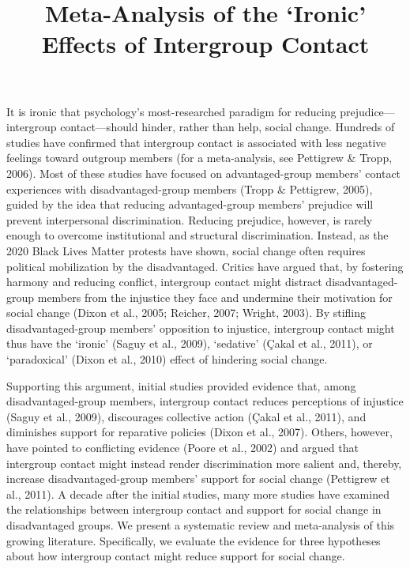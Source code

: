 \documentclass[twocolumn, 11pt, letterpaper]{article}
\title{ Meta-Analysis of the `Ironic' Effects of Intergroup Contact }
\author{  }
\begin{document}
\maketitle

\noindent It is ironic that psychology's most-researched paradigm for reducing
prejudice---intergroup contact---should hinder, rather than help, social
change. Hundreds of studies have confirmed that intergroup contact is
associated with less negative feelings toward outgroup members (for a
meta-analysis, see Pettigrew \& Tropp, 2006). Most of these studies have
focused on advantaged-group members' contact experiences with
disadvantaged-group members (Tropp \& Pettigrew, 2005), guided by the
idea that reducing advantaged-group members' prejudice will prevent
interpersonal discrimination. Reducing prejudice, however, is rarely
enough to overcome institutional and structural discrimination. Instead,
as the 2020 Black Lives Matter protests have shown, social change often
requires political mobilization by the disadvantaged. Critics have
argued that, by fostering harmony and reducing conflict, intergroup
contact might distract disadvantaged-group members from the injustice
they face and undermine their motivation for social change (Dixon et
al., 2005; Reicher, 2007; Wright, 2003). By stifling disadvantaged-group
members' opposition to injustice, intergroup contact might thus have the
`ironic' (Saguy et al., 2009), `sedative' (Çakal et al., 2011), or
`paradoxical' (Dixon et al., 2010) effect of hindering social change.

Supporting this argument, initial studies provided evidence that, among
disadvantaged-group members, intergroup contact reduces perceptions of
injustice (Saguy et al., 2009), discourages collective action (Çakal et
al., 2011), and diminishes support for reparative policies (Dixon et
al., 2007). Others, however, have pointed to conflicting evidence (Poore
et al., 2002) and argued that intergroup contact might instead render
discrimination more salient and, thereby, increase disadvantaged-group
members' support for social change (Pettigrew et al., 2011). A decade
after the initial studies, many more studies have examined the
relationships between intergroup contact and support for social change
in disadvantaged groups. We present a systematic review and
meta-analysis of this growing literature. Specifically, we evaluate the
evidence for three hypotheses about how intergroup contact might reduce
support for social change.
\end{document}
